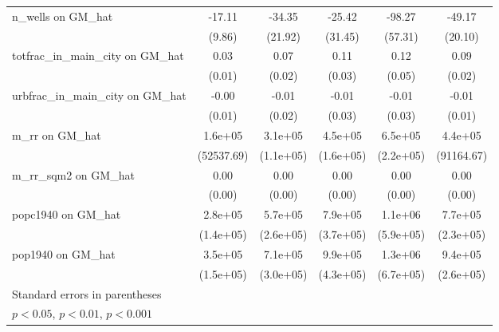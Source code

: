 \begin{table}[htbp]
\begin{tabular}{l*{5}{c}}
\addlinespace
n\_wells on GM\_hat&   -17.11         &   -34.35         &   -25.42         &   -98.27         &   -49.17\sym{*}  \\
                &   (9.86)         &  (21.92)         &  (31.45)         &  (57.31)         &  (20.10)         \\
\addlinespace
totfrac\_in\_main\_city on GM\_hat&     0.03\sym{**} &     0.07\sym{**} &     0.11\sym{**} &     0.12\sym{*}  &     0.09\sym{***}\\
                &   (0.01)         &   (0.02)         &   (0.03)         &   (0.05)         &   (0.02)         \\
\addlinespace
urbfrac\_in\_main\_city on GM\_hat&    -0.00         &    -0.01         &    -0.01         &    -0.01         &    -0.01         \\
                &   (0.01)         &   (0.02)         &   (0.03)         &   (0.03)         &   (0.01)         \\
\addlinespace
m\_rr on GM\_hat  &  1.6e+05\sym{**} &  3.1e+05\sym{**} &  4.5e+05\sym{**} &  6.5e+05\sym{**} &  4.4e+05\sym{***}\\
                &(52537.69)         &(1.1e+05)         &(1.6e+05)         &(2.2e+05)         &(91164.67)         \\
\addlinespace
m\_rr\_sqm2 on GM\_hat&     0.00         &     0.00         &     0.00         &     0.00         &     0.00\sym{*}  \\
                &   (0.00)         &   (0.00)         &   (0.00)         &   (0.00)         &   (0.00)         \\
\addlinespace
popc1940 on GM\_hat&  2.8e+05\sym{*}  &  5.7e+05\sym{*}  &  7.9e+05\sym{*}  &  1.1e+06         &  7.7e+05\sym{***}\\
                &(1.4e+05)         &(2.6e+05)         &(3.7e+05)         &(5.9e+05)         &(2.3e+05)         \\
\addlinespace
pop1940 on GM\_hat&  3.5e+05\sym{*}  &  7.1e+05\sym{*}  &  9.9e+05\sym{*}  &  1.3e+06\sym{*}  &  9.4e+05\sym{***}\\
                &(1.5e+05)         &(3.0e+05)         &(4.3e+05)         &(6.7e+05)         &(2.6e+05)         \\
\bottomrule
\multicolumn{6}{l}{\footnotesize Standard errors in parentheses}\\
\multicolumn{6}{l}{\footnotesize \sym{*} \(p<0.05\), \sym{**} \(p<0.01\), \sym{***} \(p<0.001\)}\\
\end{tabular}
\end{table}
